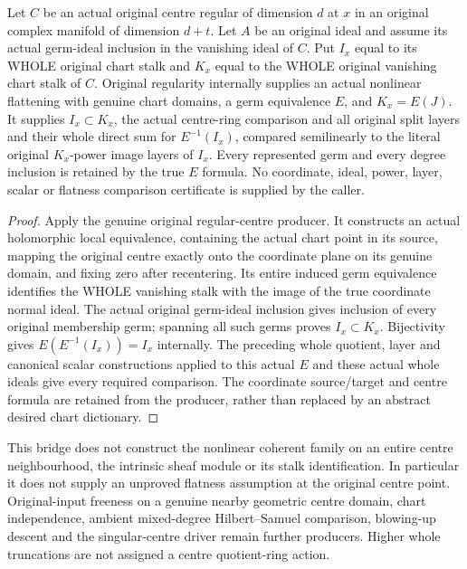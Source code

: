 \begin{theorem}
\label{hir:nonlinear-centre-original-regular-stalk-bridge}
\leanok
Let $C$ be an actual original centre regular of dimension $d$ at $x$ in
an original complex manifold of dimension $d+t$. Let $A$ be an original
ideal and assume its actual germ-ideal inclusion in the vanishing ideal
of $C$. Put $I_x$ equal to its WHOLE original chart stalk and $K_x$ equal
to the WHOLE original vanishing chart stalk of $C$. Original regularity
internally supplies an actual nonlinear flattening with genuine chart
domains, a germ equivalence $E$, and $K_x=E(J)$. It supplies
$I_x\subset K_x$, the actual centre-ring comparison and all original
split layers and their whole direct sum for $E^{-1}(I_x)$, compared
semilinearly to the literal original $K_x$-power image layers of $I_x$.
Every represented germ and every degree inclusion is retained by the
true $E$ formula. No coordinate, ideal, power, layer, scalar or flatness
comparison certificate is supplied by the caller.
\end{theorem}
\begin{proof}
Apply the genuine original regular-centre producer. It constructs an
actual holomorphic local equivalence, containing the actual chart point
in its source, mapping the original centre exactly onto the coordinate
plane on its genuine domain, and fixing zero after recentering. Its
entire induced germ equivalence identifies the WHOLE vanishing stalk
with the image of the true coordinate normal ideal. The actual original
germ-ideal inclusion gives inclusion of every original membership germ;
spanning all such germs proves $I_x\subset K_x$. Bijectivity gives
$E(E^{-1}(I_x))=I_x$ internally. The preceding whole quotient, layer and
canonical scalar constructions applied to this actual $E$ and these
actual whole ideals give every required comparison. The coordinate
source/target and centre formula are retained from the producer, rather
than replaced by an abstract desired chart dictionary.
\end{proof}

This bridge does not construct the nonlinear coherent family on an
entire centre neighbourhood, the intrinsic sheaf module or its stalk
identification. In particular it does not supply an unproved flatness
assumption at the original centre point. Original-input freeness on a
genuine nearby geometric centre domain, chart independence, ambient
mixed-degree Hilbert--Samuel comparison, blowing-up descent and the
singular-centre driver remain further producers. Higher whole truncations
are not assigned a centre quotient-ring action.
